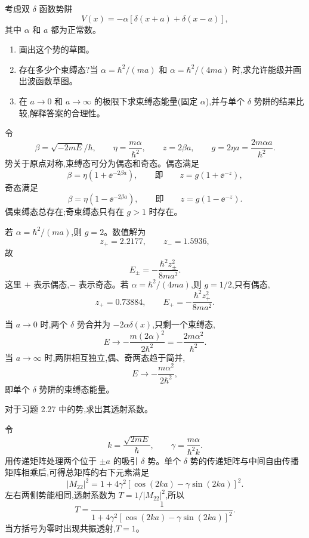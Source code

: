 \begin{question}
考虑双 $\delta$ 函数势阱
\[
V(x)=-\alpha[\delta(x+a)+\delta(x-a)],
\]
其中 $\alpha$ 和 $a$ 都为正常数。
\begin{enumerate}
\item 画出这个势的草图。
\item 存在多少个束缚态?当 $\alpha=\hbar^2/(ma)$ 和 $\alpha=\hbar^2/(4ma)$ 时,求允许能级并画出波函数草图。
\item 在 $a\to0$ 和 $a\to\infty$ 的极限下求束缚态能量(固定 $\alpha$),并与单个 $\delta$ 势阱的结果比较,解释答案的合理性。
\end{enumerate}
\begin{solution}
令
\[
\beta=\sqrt{-2mE}/\hbar,
\qquad
\eta=\frac{m\alpha}{\hbar^2},
\qquad
z=2\beta a,
\qquad
g=2\eta a=\frac{2m\alpha a}{\hbar^2}.
\]
势关于原点对称,束缚态可分为偶态和奇态。偶态满足
\[
\beta=\eta\left(1+\ee^{-2\beta a}\right),
\qquad\text{即}\qquad z=g(1+\ee^{-z}),
\]
奇态满足
\[
\beta=\eta\left(1-\ee^{-2\beta a}\right),
\qquad\text{即}\qquad z=g(1-\ee^{-z}).
\]
偶束缚态总存在;奇束缚态只有在 $g>1$ 时存在。

若 $\alpha=\hbar^2/(ma)$,则 $g=2$。数值解为
\[
z_+=2.2177,
\qquad z_-=1.5936,
\]
故
\[
E_\pm=-\frac{\hbar^2z_\pm^2}{8ma^2}.
\]
这里 $+$ 表示偶态,$-$ 表示奇态。若 $\alpha=\hbar^2/(4ma)$,则 $g=1/2$,只有偶态,
\[
z_+=0.73884,
\qquad
E_+=-\frac{\hbar^2z_+^2}{8ma^2}.
\]

当 $a\to0$ 时,两个 $\delta$ 势合并为 $-2\alpha\delta(x)$,只剩一个束缚态,
\[
E\to-\frac{m(2\alpha)^2}{2\hbar^2}=-\frac{2m\alpha^2}{\hbar^2}.
\]
当 $a\to\infty$ 时,两阱相互独立,偶、奇两态趋于简并,
\[
E\to-\frac{m\alpha^2}{2\hbar^2},
\]
即单个 $\delta$ 势阱的束缚态能量。
\end{solution}
\end{question}

\begin{question}
对于习题 2.27 中的势,求出其透射系数。
\begin{solution}
令
\[
k=\frac{\sqrt{2mE}}{\hbar},
\qquad
\gamma=\frac{m\alpha}{\hbar^2k}.
\]
用传递矩阵处理两个位于 $\pm a$ 的吸引 $\delta$ 势。单个 $\delta$ 势的传递矩阵与中间自由传播矩阵相乘后,可得总矩阵的右下元素满足
\[
|M_{22}|^2=1+4\gamma^2\left[\cos(2ka)-\gamma\sin(2ka)\right]^2.
\]
左右两侧势能相同,透射系数为 $T=1/|M_{22}|^2$,所以
\[
T=\frac{1}{1+4\gamma^2\left[\cos(2ka)-\gamma\sin(2ka)\right]^2}.
\]
当方括号为零时出现共振透射,$T=1$。
\end{solution}
\end{question}

